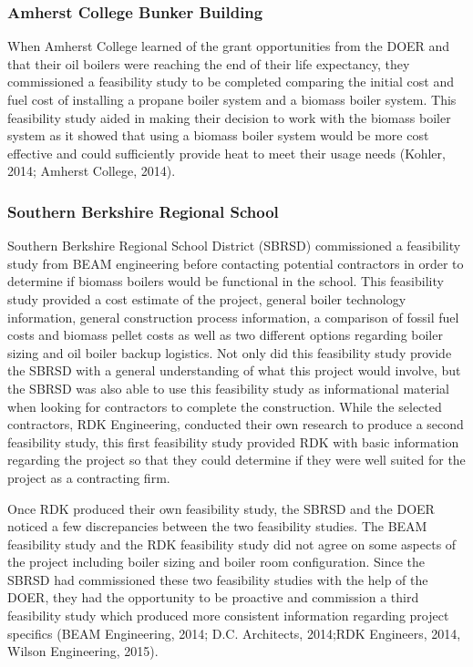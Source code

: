 \subsubsection{Amherst College Bunker Building}
\par When Amherst College learned of the grant opportunities from the DOER and that their oil boilers were reaching the end of their life expectancy, they commissioned a feasibility study to be completed comparing the initial cost and fuel cost of installing a propane boiler system and a biomass boiler system. This feasibility study aided in making their decision to work with the biomass boiler system as it showed that using a biomass boiler system would be more cost effective and could sufficiently provide heat to meet their usage needs (Kohler, 2014; Amherst College, 2014).

\subsubsection{Southern Berkshire Regional School}
\par Southern Berkshire Regional School District (SBRSD) commissioned a feasibility study from BEAM engineering before contacting potential contractors in order to determine if biomass boilers would be functional in the school. This feasibility study provided a cost estimate of the project, general boiler technology information, general construction process information, a comparison of fossil fuel costs and biomass pellet costs as well as two different options regarding boiler sizing and oil boiler backup logistics. Not only did this feasibility study provide the SBRSD with a general understanding of what this project would involve, but the SBRSD was also able to use this feasibility study as informational material when looking for contractors to complete the construction.  While the selected contractors, RDK Engineering, conducted their own research to produce a second feasibility study, this first feasibility study provided RDK with basic information regarding the project so that they could determine if they were well suited for the project as a contracting firm.
\par Once RDK produced their own feasibility study, the SBRSD and the DOER noticed a few discrepancies between the two feasibility studies. The BEAM feasibility study and the RDK feasibility study did not agree on some aspects of the project including boiler sizing and boiler room configuration. Since the SBRSD had commissioned these two feasibility studies with the help of the DOER, they had the opportunity to be proactive and commission a third feasibility study which produced more consistent information regarding project specifics (BEAM Engineering, 2014; D.C. Architects, 2014;RDK Engineers, 2014, Wilson Engineering, 2015).

